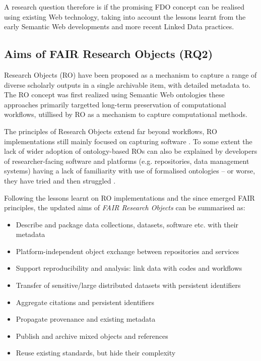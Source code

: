 A research question therefore is if the promising FDO concept can be realised using existing Web technology, taking into account the lessons learnt from the early Semantic Web developments and more recent Linked Data practices. 


\subsection{Aims of FAIR Research Objects (RQ2)}

Research Objects (RO) \cite{Bechhofer 2013} have been proposed as a mechanism to capture a range of diverse scholarly outputs in a single archivable item, with detailed metadata to. The RO concept was first realized using Semantic Web ontologies \cite{ch5-92,Belhajjame 2015} these approaches primarily targetted long-term preservation of computational workflows, utillised by RO as a mechanism to capture computational methods.

The principles of Research Objects extend far beyond workflows, RO implementations still mainly focused on capturing software \cite{goble-ro2018}. To some extent the lack of wider adoption of ontology-based ROs can also be explained by developers of researcher-facing software and platforms (e.g. repositories, data management systems) having a lack of familiarity with use of formalised ontologies -- or worse, they have tried and then struggled \cite{carrieroLandscapeOntologyReuse2020a,Tudorache 2020}.

Following the lessons learnt on RO implementations and the since emerged FAIR principles, the updated aims of \emph{FAIR Research Objects} can be summarised as:

\begin{itemize}
    \item Describe and package data collections, datasets, software etc. with their metadata
    \item Platform-independent object exchange between repositories and services
    \item Support reproducibility and analysis: link data with codes and workflows
    \item Transfer of sensitive/large distributed datasets with persistent identifiers
    \item Aggregate citations and persistent identifiers
    \item Propagate provenance and existing metadata
    \item Publish and archive mixed objects and references
    \item Reuse existing standards, but hide their complexity
\end{itemize}

